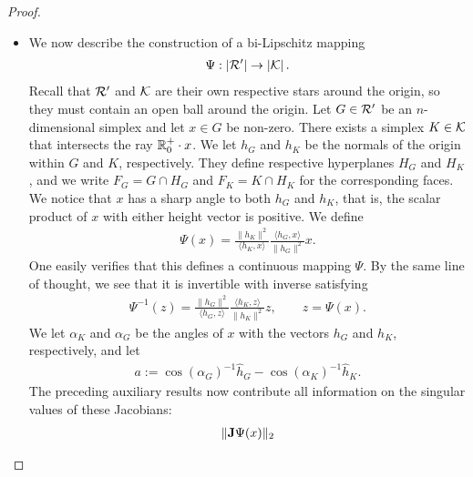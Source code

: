 \documentclass[10pt,a4paper]{article}
\newcommand{\mwl}[1]{{\color{red}#1}}
\begin{document}
\begin{proof}
\begin{itemize}
        \item 
        We now describe the construction of a bi-Lipschitz mapping 
        \begin{align*}
            \Psi : \left| {\mathcal R}' \right| \rightarrow \left| {\mathcal K} \right|.
        \end{align*}
        Recall that ${\mathcal R}'$ and ${\mathcal K}$ are their own respective stars around the origin,
        so they must contain an open ball around the origin. 
        Let ${G} \in {\mathcal R}'$ be an $n$-dimensional simplex and let $x \in {G}$ be non-zero. There exists a simplex $K \in {\mathcal K}$ that intersects the ray ${\mathbb R}_0^+ \cdot x$. We let $h_{{G}}$ and $h_{K}$ be the normals of the origin within ${G}$ and $K$, respectively. They define respective hyperplanes $H_{G}$ and $H_{K}$,
        and we write $F_{G} = G \cap H_{G}$ and $F_{K} = K \cap H_{K}$ for the corresponding faces. 
        We notice that $x$ has a sharp angle to both $h_{{G}}$ and $h_{K}$,
        that is, the scalar product of $x$ with either height vector is positive. 
        We define 
        \begin{align*}
            \Psi(x) 
            = 
            \frac{ \| h_K \|^{2} }{ \langle h_K, x \rangle }
            \frac{ \langle h_{{G}}, x \rangle }{ \| h_{{G}} \|^{2} }
            x
            .
        \end{align*}
        One easily verifies that this defines a continuous mapping $\Psi$. 
        By the same line of thought, we see that it is invertible with inverse satisfying 
        \begin{align*}
            \Psi^{-1}(z) 
            = 
            \frac{ \| h_{{G}} \|^{2} }{ \langle h_{{G}}, z \rangle }
            \frac{ \langle h_K, z \rangle }{ \| h_K \|^{2} }
            z,
            \qquad 
            z = \Psi(x)
            .
        \end{align*}
        We let $\alpha_K$ and $\alpha_{{G}}$ be the angles of $x$ with the vectors $h_{{G}}$ and $h_{K}$, respectively,
        and let 
        \begin{align*}
            a := \cos(\alpha_{{G}})^{-1} \hat h_{{G}} - \cos(\alpha_K)^{-1} \hat h_K
            .
        \end{align*}
        The preceding auxiliary results now contribute all information on the singular values of these Jacobians:
        \begin{gather*}
            \matnorm{ \Jacobian\Psi(x) }

\end{gather*}
\end{itemize}
\end{proof}
\end{document}
